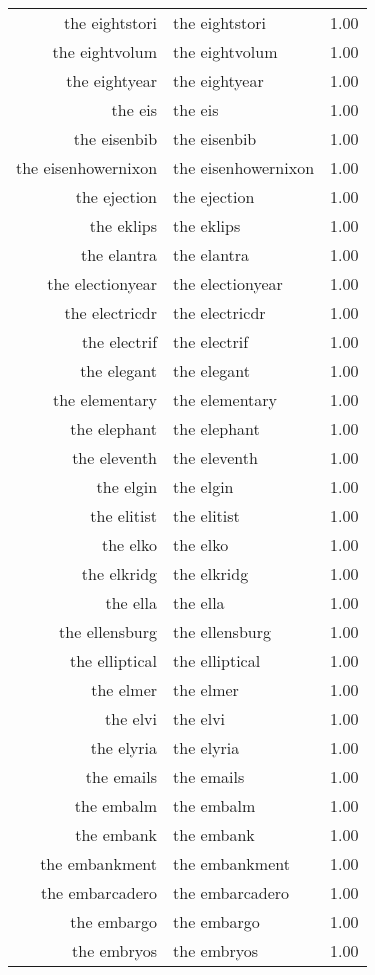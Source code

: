 \begin{table}[ht]
\begin{tabular}{rlr}
  the eightstori & the eightstori & 1.00 \\ 
  the eightvolum & the eightvolum & 1.00 \\ 
  the eightyear & the eightyear & 1.00 \\ 
  the eis & the eis & 1.00 \\ 
  the eisenbib & the eisenbib & 1.00 \\ 
  the eisenhowernixon & the eisenhowernixon & 1.00 \\ 
  the ejection & the ejection & 1.00 \\ 
  the eklips & the eklips & 1.00 \\ 
  the elantra & the elantra & 1.00 \\ 
  the electionyear & the electionyear & 1.00 \\ 
  the electricdr & the electricdr & 1.00 \\ 
  the electrif & the electrif & 1.00 \\ 
  the elegant & the elegant & 1.00 \\ 
  the elementary & the elementary & 1.00 \\ 
  the elephant & the elephant & 1.00 \\ 
  the eleventh & the eleventh & 1.00 \\ 
  the elgin & the elgin & 1.00 \\ 
  the elitist & the elitist & 1.00 \\ 
  the elko & the elko & 1.00 \\ 
  the elkridg & the elkridg & 1.00 \\ 
  the ella & the ella & 1.00 \\ 
  the ellensburg & the ellensburg & 1.00 \\ 
  the elliptical & the elliptical & 1.00 \\ 
  the elmer & the elmer & 1.00 \\ 
  the elvi & the elvi & 1.00 \\ 
  the elyria & the elyria & 1.00 \\ 
  the emails & the emails & 1.00 \\ 
  the embalm & the embalm & 1.00 \\ 
  the embank & the embank & 1.00 \\ 
  the embankment & the embankment & 1.00 \\ 
  the embarcadero & the embarcadero & 1.00 \\ 
  the embargo & the embargo & 1.00 \\ 
  the embryos & the embryos & 1.00 \\ 

\end{tabular}
\end{table}
